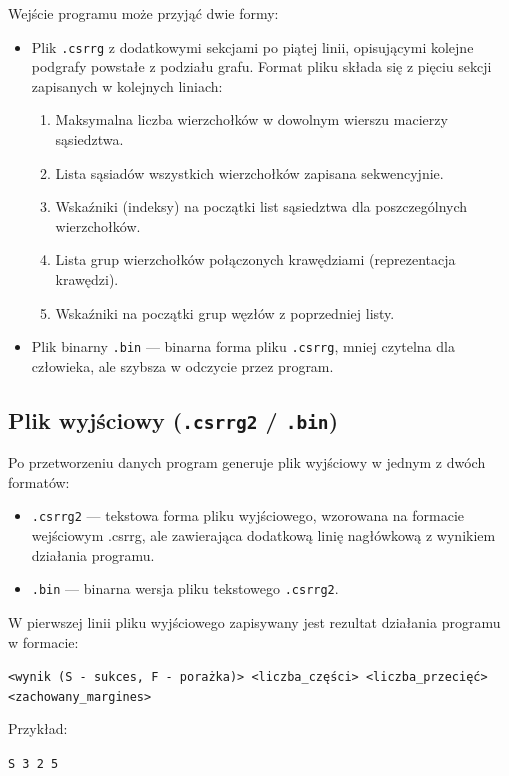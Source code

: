 \documentclass{article}
\begin{document}
    Wejście programu może przyjąć dwie formy:
    \begin{itemize}
        \item Plik \texttt{.csrrg} z dodatkowymi sekcjami po piątej linii, opisującymi kolejne podgrafy powstałe z podziału grafu.
        Format pliku składa się z pięciu sekcji zapisanych w kolejnych liniach:
        \begin{enumerate}
            \item Maksymalna liczba wierzchołków w dowolnym wierszu macierzy sąsiedztwa.
            \item Lista sąsiadów wszystkich wierzchołków zapisana sekwencyjnie.
            \item Wskaźniki (indeksy) na początki list sąsiedztwa dla poszczególnych wierzchołków.
            \item Lista grup wierzchołków połączonych krawędziami (reprezentacja krawędzi).
            \item Wskaźniki na początki grup węzłów z poprzedniej listy.
        \end{enumerate}
        \item Plik binarny \texttt{.bin} — binarna forma pliku \texttt{.csrrg}, mniej czytelna dla człowieka, ale szybsza w odczycie przez program.
    \end{itemize}
    
    \subsection{Plik wyjściowy (\texttt{.csrrg2} / \texttt{.bin})}

    Po przetworzeniu danych program generuje plik wyjściowy w jednym z dwóch formatów:
    \begin{itemize}
        \item \texttt{.csrrg2} — tekstowa forma pliku wyjściowego, wzorowana na formacie wejściowym .csrrg, ale zawierająca dodatkową linię nagłówkową z wynikiem działania programu.
        \item \texttt{.bin} — binarna wersja pliku tekstowego \texttt{.csrrg2}.
    \end{itemize}
    
    W pierwszej linii pliku wyjściowego zapisywany jest rezultat działania programu w formacie:
    \begin{center}
    \texttt{<wynik (S - sukces, F - porażka)> <liczba\_części> <liczba\_przecięć> <zachowany\_margines>}
    \end{center}
    Przykład:
    \begin{center}
    \texttt{S 3 2 5}
    \end{center}
    
\end{document}
